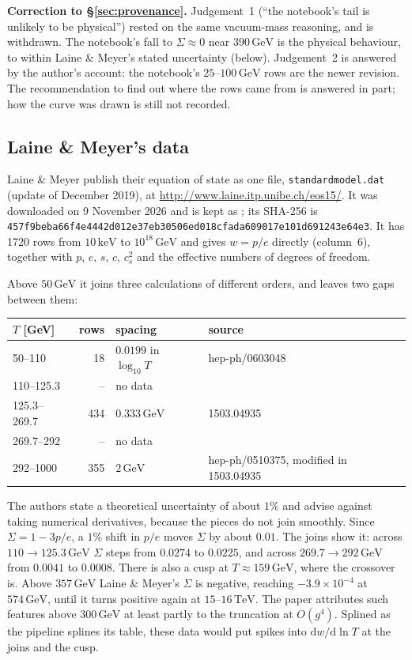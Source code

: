 \documentclass[11pt,a4paper]{article}
\newcommand{\GeV}{\,\mathrm{GeV}}
\newcommand{\code}[1]{\texttt{#1}}
\begin{document}
\medskip\noindent
\textbf{Correction to \S\ref{sec:provenance}.} Judgement~1 (``the notebook's tail is unlikely to be
physical'') rested on the same vacuum-mass reasoning, and is withdrawn. The notebook's fall to
$\Sigma \approx 0$ near $390\GeV$ is the physical behaviour, to within Laine \& Meyer's stated
uncertainty (below). Judgement~2 is answered by the author's account: the notebook's
$25$--$100\GeV$ rows are the newer revision. The recommendation to find out where the rows came from
is answered in part; how the curve was drawn is still not recorded.

\subsection{Laine \& Meyer's data}

Laine \& Meyer publish their equation of state as one file, \code{standardmodel.dat} (update of
December 2019), at \url{http://www.laine.itp.unibe.ch/eos15/}. It was downloaded on 9 November 2026
and is kept as ; its SHA-256 is\\
{\small\code{457f9beba66f4e4442d012e37eb30506ed018cfada609017e101d691243e64e3}}.
It has 1720 rows from $10\,\mathrm{keV}$ to $10^{18}\GeV$ and gives $w = p/e$ directly (column~6),
together with $p$, $e$, $s$, $c$, $c_s^2$ and the effective numbers of degrees of freedom.

Above $50\GeV$ it joins three calculations of different orders, and leaves two gaps between them:
\begin{center}\small
\begin{tabular}{@{}lrll@{}}
\toprule
$T$ [GeV] & rows & spacing & source \\
\midrule
50--110 & 18 & $0.0199$ in $\log_{10}T$ & hep-ph/0603048 \\
110--125.3 & -- & no data & \\
125.3--269.7 & 434 & $0.333\GeV$ & 1503.04935 \\
269.7--292 & -- & no data & \\
292--1000 & 355 & $2\GeV$ & hep-ph/0510375, modified in 1503.04935 \\
\bottomrule
\end{tabular}
\end{center}
The authors state a theoretical uncertainty of about $1\%$ and advise against taking numerical
derivatives, because the pieces do not join smoothly. Since $\Sigma = 1 - 3p/e$, a $1\%$ shift in
$p/e$ moves $\Sigma$ by about $0.01$. The joins show it: across $110 \to 125.3\GeV$ $\Sigma$ steps
from $0.0274$ to $0.0225$, and across $269.7 \to 292\GeV$ from $0.0041$ to $0.0008$. There is also a
cusp at $T \approx 159\GeV$, where the crossover is. Above $357\GeV$ Laine \& Meyer's $\Sigma$ is
negative, reaching $-3.9\times10^{-4}$ at $574\GeV$, until it turns positive again at
$15$--$16\,\mathrm{TeV}$. The paper attributes such features above $300\GeV$ at least partly to the
truncation at $O(g^4)$. Splined as the pipeline splines its table, these data would put spikes into
$\mathrm{d}w/\mathrm{d}\ln T$ at the joins and the cusp.
\end{document}
